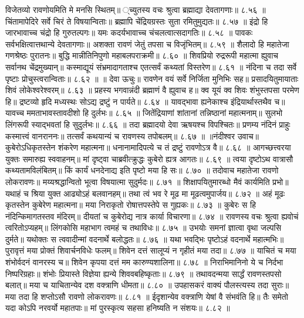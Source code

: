 विजेतव्यो रावणोयमिति मे मनसि स्थितम्॥
्च्युतस्य वचः श्रुत्वा ब्रह्माद्या देवतागणाः॥ ८.५६ ॥
चिंतामापेदिरे सर्वे चिरं ते विषयान्विताः॥
ब्रह्मापि चेंद्रियग्रस्तः सुता रमितुमुद्यतः॥ ८.५७ ॥
इंद्रो हि जारभावाच्च चंद्रो हि गुरुतल्पगः॥
यमः कदर्यभावाच्च चंचलत्वात्सदागतिः॥ ८.५८ ॥
पावकः सर्वभक्षित्वात्तथान्ये देवतागणाः॥
अशक्ता रावणं जेतुं तपसा च विजृंभितम्॥ ८.५९ ॥
शैलादो हि महातेजा गणश्रेष्ठः पुरातनः॥
बुद्धि मान्नीतिनिपुणो महाबलपराक्रमी॥ ८.६० ॥
शिवप्रियो रुद्ररूपी महात्मा ह्युवाच सर्वानथ चेंद्रमुख्यान्॥
कस्माद्यूयं संभ्रमादागताश्च एतत्सर्वं कथ्यतां विस्तरेण॥ ८.६१ ॥
नंदिना च तदा सर्वे पृष्टाः प्रोचुस्त्वरान्विताः॥ ८.६२ ॥
॥ देवा ऊचुः॥
रावणेन वयं सर्वे निर्जिता मुनिभिः सह॥
प्रसादयितुमायाताः शिवं लोकेश्वरेश्वरम्॥ ८.६३ ॥
प्रहस्य भगवान्नंदी ब्रह्माणं वै ह्युवाच ह॥
क्व यूयं क्व शिवः शंभुस्तपसा परमेण हि॥
द्रष्टव्यो हृदि मध्यस्थः सोऽद्य द्रष्टुं न पार्यते॥ ८.६४ ॥
यावद्भावा ह्यनेकाश्च इंद्रियार्थास्तथैव च॥
यावच्च ममताभावस्तावदीशो हि दुर्लभः॥ ८.६५ ॥
जितेंद्रियाणां शांतानां तन्निष्ठानां महात्मनाम्॥
सुलभो लिंगरूपी स्याद्भवतां हि सुदुर्लभः॥ ८.६६ ॥
तदा ब्रह्मादयो देवा ऋषयश्च विपश्चितः॥
प्रणम्य नंदिनं प्राहुः कस्मात्त्वं वानराननः॥
तत्सर्वं कथयान्यं च रावणस्य तपोबलम्॥ ८.६७ ॥
॥नंदीश्वर उवाच॥
कुबेरोऽधिकृतस्तेन शंकरेण महात्मना॥
धनानामादिपत्ये च तं द्रष्टुं रावणोऽत्र वै॥ ८.६८ ॥
आगच्छत्त्वरया युक्तः समारुह्य स्ववाहनम्॥
मां दृष्ट्वा चाब्रवीत्क्रुद्धः कुबेरो ह्यत्र आगतः॥ ८.६९ ॥
त्वया दृष्टोऽथ वात्रासौ कथ्यतामविलंबितम्॥
किं कार्यं धनदेनाद्य इति पृष्टो मया हि सः॥ ८.७० ॥
तदोवाच महातेजा रावणो लोकरावणः॥
मय्यश्रद्धान्वितो भूत्वा विषयात्मा सुदुर्मदः॥ ८.७१ ॥
शिक्षापयितुमारब्धो मैवं कार्यमिति प्रभो॥
यथाहं च श्रिया युक्त आढ्योऽहं बलवानहम्॥
तथा त्वं भव रे मूढ मा मूढत्वमुपार्जय॥ ८.७२ ॥
अहं मूढः कृतस्तेन कुबेरेण महात्मना॥
मया निराकृतो रोषात्तपस्तेपे स गुह्यकः॥ ८.७३ ॥
कुबेरः स हि नंदिन्किमागतस्तव मंदिरम्॥
दीयतां च कुबेरोद्य नात्र कार्या विचारणा॥ ८.७४ ॥
रावणस्य वचः श्रुत्वा ह्यवोचं त्वरितोऽप्यहम्॥
लिंगकोसि महाभाग त्वमहं च तथाविधः॥ ८.७५ ॥
उभयोः समनां ज्ञात्वा वृथा जल्पसि दुर्मते॥
यथोक्तः स त्ववादीन्मां वदनार्थे बलोद्धतः॥ ८.७६ ॥
यथा भवद्भिः पृष्टोऽहं वदनार्थे महात्मभिः॥
पुरावृत्तं मया प्रोक्तं शिवार्चनविधेः फलम्॥
शिवेन दत्तं सालूप्यं न गृहीतं मया तदा॥ ८.७७ ॥
याचितं च मया शंभोर्वदनं वानरस्य च॥
शिवेन कृपया दत्तं मम कारुण्यशालिना॥ ८.७८ ॥
निराभिमानिनो ये च निर्दभा निष्परिग्रहाः॥
शंभोः प्रियास्ते विज्ञेया ह्यन्ये शिववबहिष्कृताः॥ ८.७९ ॥
तथावदन्मया सार्द्धं रावणस्तपसो बलात्॥
मया च याचितान्येव दश वक्त्राणि धीमता॥ ८.८० ॥
उपहासकरं वाक्यं पौलस्त्यस्य तदा सुराः॥
मया तदा हि शप्तोऽसौ रावणो लोकरावणः॥ ८.८१ ॥
ईदृशान्येव वक्त्राणि येषां वै संभवंति हि॥
तैः समेतो यदा कोऽपि नरवर्यो महातपाः॥
मां पुरस्कृत्य सहसा हनिष्यति न संशयः॥ ८.८२ ॥
